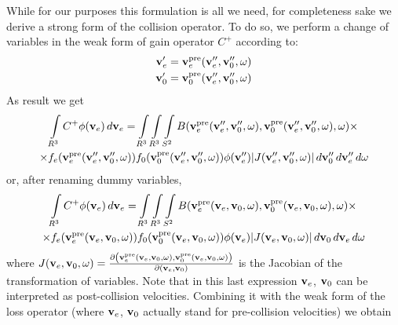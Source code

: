 \documentclass{article}
\begin{document}
While for our purposes this formulation is all we need, for completeness sake we derive a strong form of the collision operator. To do so, we perform a change of variables in the weak form of gain operator $C^+$ according to:
\begin{align*}
\vect{v}_e^\prime &= \vect{v}_e^\text{pre} \of{\vect{v}_e^{\prime\prime}, \vect{v}_0^{\prime\prime}, \vect{\omega}}
\\
\vect{v}_0^\prime &= \vect{v}_0^\text{pre} \of{\vect{v}_e^{\prime\prime}, \vect{v}_0^{\prime\prime}, \vect{\omega}}
\end{align*}
As result we get
\begin{multline*}
\myint_{R^3} C^+ \phi\of{\vect{v}_e} \diff{\vect{v}_e} 
= 
\myint_{R^3} \myint_{R^3} \myint_{S^2} 
B\of{\vect{v}_e^\text{pre} \of{\vect{v}_e^{\prime\prime}, \vect{v}_0^{\prime\prime}, \vect{\omega}}, \vect{v}_0^\text{pre} \of{\vect{v}_e^{\prime\prime}, \vect{v}_0^{\prime\prime}, \vect{\omega}}, \vect{\omega}} 
\times
\\
\times
f_e\of{\vect{v}_e^\text{pre} \of{\vect{v}_e^{\prime\prime}, \vect{v}_0^{\prime\prime}, \vect{\omega}}} 
f_0\of{\vect{v}_0^\text{pre} \of{\vect{v}_e^{\prime\prime}, \vect{v}_0^{\prime\prime}, \vect{\omega}}} 
\phi\of{\vect{v}_e^{\prime\prime}} 
|J\of{\vect{v}_e^{\prime\prime}, \vect{v}_0^{\prime\prime}, \vect{\omega}}|
\diff{\vect{v}_0^{\prime\prime}} \diff{\vect{v}_e^{\prime\prime}} \diff{\vect{\omega}}
\end{multline*}
or, after renaming dummy variables,
\begin{multline*}
\myint_{R^3} C^+ \phi\of{\vect{v}_e} \diff{\vect{v}_e} 
= 
\myint_{R^3} \myint_{R^3} \myint_{S^2} 
B\of{\vect{v}_e^\text{pre} \of{\vect{v}_e, \vect{v}_0, \vect{\omega}}, \vect{v}_0^\text{pre} \of{\vect{v}_e, \vect{v}_0, \vect{\omega}}, \vect{\omega}} 
\times
\\
\times
f_e\of{\vect{v}_e^\text{pre} \of{\vect{v}_e, \vect{v}_0, \vect{\omega}}} 
f_0\of{\vect{v}_0^\text{pre} \of{\vect{v}_e, \vect{v}_0, \vect{\omega}}} 
\phi\of{\vect{v}_e} 
|J\of{\vect{v}_e, \vect{v}_0, \vect{\omega}}|
\diff{\vect{v}_0} \diff{\vect{v}_e} \diff{\vect{\omega}}
\end{multline*}
where $J\of{\vect{v}_e, \vect{v}_0, \vect{\omega}} = \frac{ \partial \left( \vect{v}_e^\text{pre}\of{\vect{v}_e, \vect{v}_0, \vect{\omega}}, \vect{v}_0^\text{pre}\of{\vect{v}_e, \vect{v}_0, \vect{\omega}} \right)}{\partial \left( \vect{v}_e, \vect{v}_0 \right)}$ is the Jacobian of the transformation of variables. Note that in this last expression $\mathbf{v}_e$, $\mathbf{v}_0$ can be interpreted as post-collision velocities. Combining it with the weak form of the loss operator (where $\mathbf{v}_e$, $\mathbf{v}_0$ actually stand for pre-collision velocities) we obtain
\end{document}
